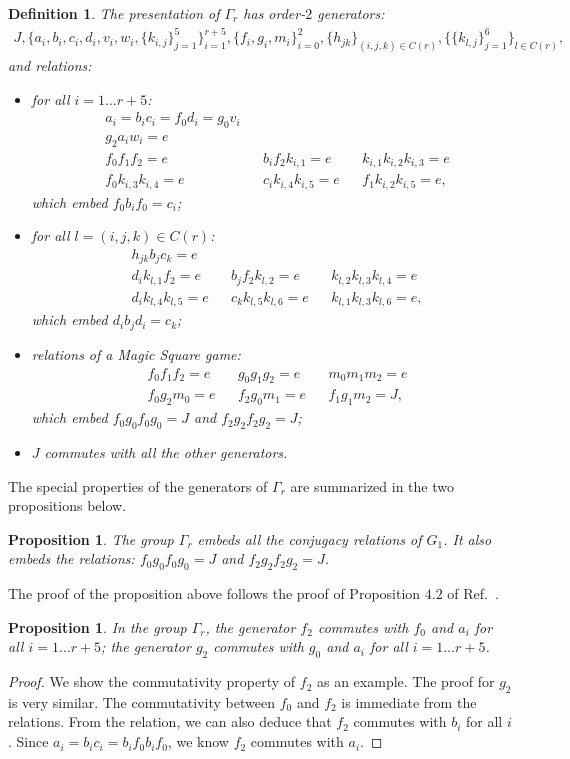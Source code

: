 \documentclass[11pt,letterpaper]{article}
\newcommand{\1}{\mathbb{1}}
\newtheorem{proposition}[theorem]{Proposition}
\newtheorem{definition}[theorem]{Definition}
\theoremstyle{definition}
\begin{document}
\begin{definition}
\label{def:gamma}
The presentation of $\Gamma_r$ has order-$2$ generators:
\begin{align*}
	J, \{a_i, b_i, c_i, d_i, v_i,w_i,\{ k_{i,j} \}_{j=1}^5\}_{i=1}^{r+5}, \{f_i,g_i,m_i\}_{i=0}^2, \{h_{jk}\}_{(i,j,k) \in C(r)}, 
	\{\{ k_{l,j} \}_{j=1}^6\}_{l \in C(r)},
\end{align*}
and relations:
\begin{itemize}
\item for all $i = 1 \dots r+5$:
\begin{align*}
	&a_i = b_ic_i = f_0d_i = g_0v_i \\
	&g_2 a_i w_i = e \\
	&f_0 f_1 f_2 = e && b_i f_2 k_{i,1} = e && k_{i,1} k_{i,2} k_{i,3} = e\\
	&f_0 k_{i,3} k_{i,4} = e && c_i k_{i,4} k_{i,5} =e && f_1 k_{i,2} k_{i,5} = e,
\end{align*}
which embed $f_0 b_i f_0 = c_i$;
\item for all $ l = (i,j,k) \in C(r)$:
\begin{align*}
	&h_{jk}b_j c_k = e\\
	&d_i k_{l,1} f_2 = e && b_j f_2 k_{l,2} = e && k_{l,2} k_{l,3} k_{l,4} = e\\
	&d_i k_{l,4} k_{l,5} = e && c_k k_{l,5} k_{l,6} =e && k_{l,1} k_{l,3} k_{l,6} = e,
\end{align*}
which embed $d_i b_j d_i = c_k$;
\item relations of a Magic Square game:
\begin{align*}
	&f_0 f_1 f_2 = e && g_0 g_1 g_2 = e &&m_0 m_1 m_2 = e \\
	&f_0 g_2 m_0 = e && f_2 g_0 m_1 = e && f_1 g_1 m_2 = J,
\end{align*}
which embed $f_0 g_0 f_0 g_0 = J$ and $f_2 g_2 f_2 g_2 = J$;
\item $J$ commutes with all the other generators.
\end{itemize}
\end{definition}
The special properties of the generators of $\Gamma_r$ are summarized in the two propositions below.
\begin{proposition}
	The group $\Gamma_r$ embeds all the conjugacy relations of $G_1$.
	It also embeds the relations: $f_0 g_0 f_0 g_0 = J$ and $f_2 g_2 f_2 g_2 = J$.
\end{proposition}
The proof of the proposition above follows the proof of Proposition $4.2$ of Ref.~\cite{slofstra2017}.
\begin{proposition}
	In the group $\Gamma_r$, the generator $f_2$ commutes with $f_0$ and $a_i$ for all $i = 1 \dots r+5$;
	the generator $g_2$ commutes with $g_0$ and $a_i$ for all $i = 1 \dots r+5$.
\end{proposition}
\begin{proof}
	We show the commutativity property of $f_2$ as an example. The proof for $g_2$ is very similar.
	The commutativity between $f_0$ and $f_2$ is immediate from the relations.
	From the relation, we can also deduce that $f_2$ commutes with $b_i$ for all $i$.
	Since $a_i =b_ic_i = b_i f_0 b_i f_0$, we know $f_2$ commutes with $a_i$.
\end{proof}
\end{document}
